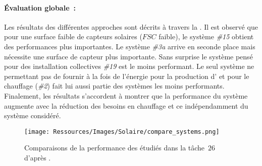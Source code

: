 \paragraph{Évaluation globale~:} %
\label{par:evaluation_globale}
Les résultats des différentes approches sont décrits à travers la .
Il est observé que pour une surface faible de capteurs solaires ($FSC$ faible), le système \emph{\#15}
obtient des performances plus importantes. Le système \emph{\#3a} arrive en seconde place
mais nécessite une surface de capteur plus importante. Sans surprise le système pensé
pour des installation collectives \emph{\#19} est le moins performant. Le seul système
ne permettant pas de fournir à la fois de l’énergie pour la production d’
et pour le chauffage (\emph{\#2}) fait lui aussi partie des systèmes les moins performants.
Finalement, les résultats s’accordent à montrer que la performance du système augmente avec la réduction des
besoins en chauffage et ce indépendamment du système considéré.

\begin{figure}
    \centering
    \texttt{[image: Ressources/Images/Solaire/compare\_systems.png]}
    \caption[Comparaisons de la performance des  étudiés dans la tâche\,$26$]
            {Comparaisons de la performance des  étudiés dans la tâche
             \,$26$ d’après \textcite{Task26C2007}.}
    \label{fig:compare_perf_ssc}
\end{figure}

